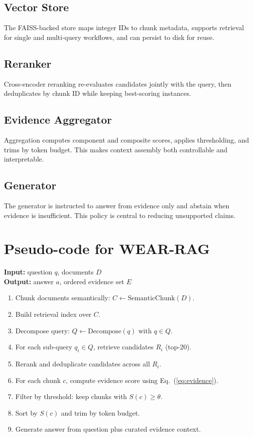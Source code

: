 \documentclass[10pt,draftclsnofoot,onecolumn,journal]{IEEEtran}
\begin{document}
\subsection{Vector Store}
The FAISS-backed store maps integer IDs to chunk metadata, supports retrieval for single and multi-query workflows, and can persist to disk for reuse.

\subsection{Reranker}
Cross-encoder reranking re-evaluates candidates jointly with the query, then deduplicates by chunk ID while keeping best-scoring instances.

\subsection{Evidence Aggregator}
Aggregation computes component and composite scores, applies thresholding, and trims by token budget. This makes context assembly both controllable and interpretable.

\subsection{Generator}
The generator is instructed to answer from evidence only and abstain when evidence is insufficient. This policy is central to reducing unsupported claims.

\section{Pseudo-code for WEAR-RAG}
\noindent\textbf{Input:} question $q$, documents $D$\\
\noindent\textbf{Output:} answer $a$, ordered evidence set $E$

\begin{enumerate}
\item Chunk documents semantically: $C \gets \text{SemanticChunk}(D)$.
\item Build retrieval index over $C$.
\item Decompose query: $Q \gets \text{Decompose}(q)$ with $q \in Q$.
\item For each sub-query $q_i \in Q$, retrieve candidates $R_i$ (top-20).
\item Rerank and deduplicate candidates across all $R_i$.
\item For each chunk $c$, compute evidence score using Eq.~(\ref{eq:evidence}).
\item Filter by threshold: keep chunks with $S(c) \geq \theta$.
\item Sort by $S(c)$ and trim by token budget.
\item Generate answer from question plus curated evidence context.
\end{enumerate}
\end{document}
